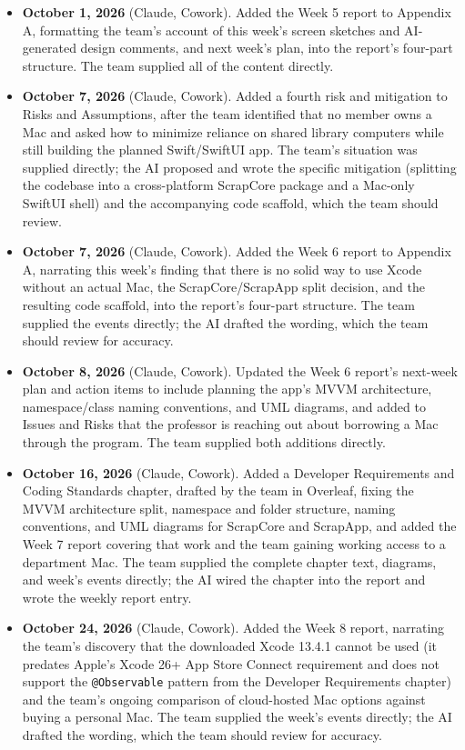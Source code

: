 \begin{itemize}[leftmargin=1.4em]
\item \textbf{October 1, 2026} (Claude, Cowork). Added the Week 5 report to Appendix A, formatting the team's account of this week's screen sketches and AI-generated design comments, and next week's plan, into the report's four-part structure. The team supplied all of the content directly.

\item \textbf{October 7, 2026} (Claude, Cowork). Added a fourth risk and mitigation to Risks and Assumptions, after the team identified that no member owns a Mac and asked how to minimize reliance on shared library computers while still building the planned Swift/SwiftUI app. The team's situation was supplied directly; the AI proposed and wrote the specific mitigation (splitting the codebase into a cross-platform ScrapCore package and a Mac-only SwiftUI shell) and the accompanying code scaffold, which the team should review.

\item \textbf{October 7, 2026} (Claude, Cowork). Added the Week 6 report to Appendix A, narrating this week's finding that there is no solid way to use Xcode without an actual Mac, the ScrapCore/ScrapApp split decision, and the resulting code scaffold, into the report's four-part structure. The team supplied the events directly; the AI drafted the wording, which the team should review for accuracy.

\item \textbf{October 8, 2026} (Claude, Cowork). Updated the Week 6 report's next-week plan and action items to include planning the app's MVVM architecture, namespace/class naming conventions, and UML diagrams, and added to Issues and Risks that the professor is reaching out about borrowing a Mac through the program. The team supplied both additions directly.

\item \textbf{October 16, 2026} (Claude, Cowork). Added a Developer Requirements and Coding Standards chapter, drafted by the team in Overleaf, fixing the MVVM architecture split, namespace and folder structure, naming conventions, and UML diagrams for ScrapCore and ScrapApp, and added the Week 7 report covering that work and the team gaining working access to a department Mac. The team supplied the complete chapter text, diagrams, and week's events directly; the AI wired the chapter into the report and wrote the weekly report entry.

\item \textbf{October 24, 2026} (Claude, Cowork). Added the Week 8 report, narrating the team's discovery that the downloaded Xcode 13.4.1 cannot be used (it predates Apple's Xcode 26+ App Store Connect requirement and does not support the \texttt{@Observable} pattern from the Developer Requirements chapter) and the team's ongoing comparison of cloud-hosted Mac options against buying a personal Mac. The team supplied the week's events directly; the AI drafted the wording, which the team should review for accuracy.

\end{itemize}
